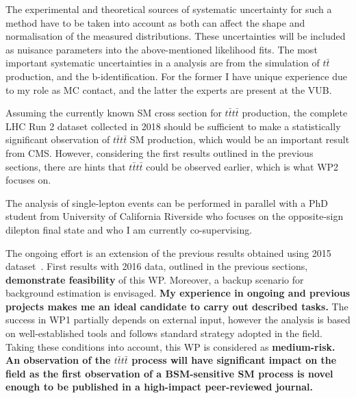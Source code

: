 The experimental and theoretical sources of systematic uncertainty for such a method have to be taken into account as both can affect the shape and normalisation of the measured distributions. These uncertainties will be included as nuisance parameters into the above-mentioned likelihood fits.
The most important systematic uncertainties in a \fourtop analysis are from the simulation of $t\bar{t}$ production, and the b-identification. For the former I have unique experience due to my role as MC contact, and the latter the experts are present at the VUB. 

Assuming the currently known SM cross section for $t\bar{t}t\bar{t}$ production, the complete LHC Run 2 dataset collected in 2018 should be sufficient to make a statistically significant observation of $t\bar{t}t\bar{t}$ SM production, which would be an important result from CMS. However, considering the first results outlined in the previous sections, there are hints that $t\bar{t}t\bar{t}$ could be observed earlier, which is what WP2 focuses on. 

The analysis of single-lepton events can be performed in parallel with a PhD student from University of California Riverside who focuses on the opposite-sign dilepton final state and who I am currently co-supervising. 

The ongoing effort is an extension of the previous results obtained using 2015 dataset~\cite{Sirunyan:2017tep}. First results with 2016 data, outlined in the previous sections, \textbf{demonstrate feasibility} of this WP. Moreover, a backup scenario for background estimation is envisaged. \textbf{My experience in ongoing and previous projects makes me an ideal candidate to carry out described tasks.}
The success in WP1 partially depends on external input, however the analysis is based on well-established tools and follows standard strategy adopted in the field. Taking these conditions into account, this WP is considered as \textbf{medium-risk.} \textbf{An observation of the $t\bar{t}t\bar{t}$ process will have significant impact on the field as the first observation of a BSM-sensitive SM \tttt process is  novel enough to be published in a high-impact peer-reviewed journal.}

